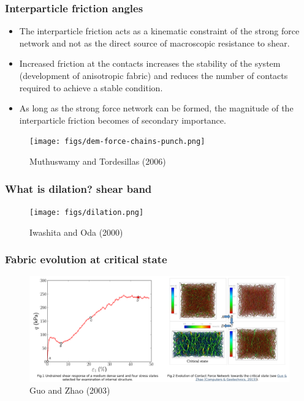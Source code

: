 \documentclass[notes]{beamer}
\begin{document}
\begin{frame}
\frametitle{Interparticle friction angles}
\noindent
\fboxsep=0pt
\noindent
\begin{minipage}[t]{0.65\linewidth}
	\begin{itemize}
		\item The interparticle friction acts as a kinematic
		constraint of the strong force network and not as
		the direct source of macroscopic resistance to
		shear.
		\item Increased friction at the contacts increases the
		stability of the system (development of
		anisotropic fabric) and reduces the number of
		contacts required to achieve a stable condition.
		\item As long as the strong force network can be
		formed, the magnitude of the interparticle friction
		becomes of secondary importance.
	\end{itemize}
\end{minipage}%
\hfill
\begin{minipage}[t]{0.35\linewidth}
	\begin{figure}
		\texttt{[image: figs/dem-force-chains-punch.png]}
		\caption*{Muthuswamy and Tordesillas (2006)}
	\end{figure}
\end{minipage}
\end{frame}


\begin{frame}
\frametitle{What is dilation? shear band}
\begin{figure}
	\texttt{[image: figs/dilation.png]}
	\caption*{Iwashita and Oda (2000)}
\end{figure}
\end{frame}


\begin{frame}
\frametitle{Fabric evolution at critical state}
	\begin{figure}
	\includegraphics[width=\textwidth]{figs/fabric-evolution-cs.png}
	\caption*{Guo and Zhao (2003)}
\end{figure}
\end{frame}
\end{document}
